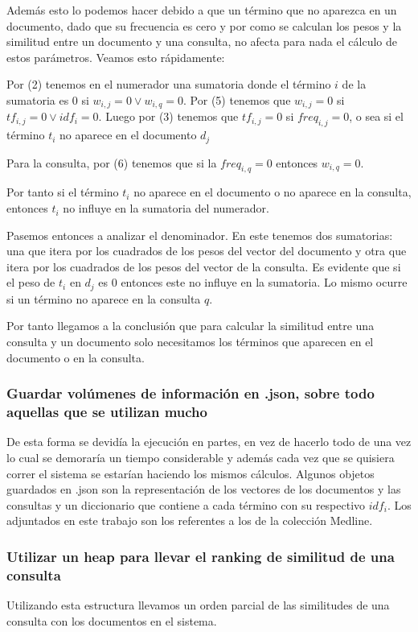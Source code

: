 \documentclass[runningheads]{llncs}
\begin{document}
	Adem\'as esto lo podemos hacer debido a que un t\'ermino que no aparezca en un documento, dado que su frecuencia es cero y por como se calculan los pesos y la similitud entre un documento y una consulta, no afecta para nada el c\'alculo de estos par\'ametros. Veamos esto r\'apidamente:
	
	Por (2) tenemos en el numerador una sumatoria donde el t\'ermino $i$ de la sumatoria es 0 si $w_{i,j}=0 \lor w_{i,q}=0$. Por (5) tenemos que $w_{i,j}=0$ si $tf_{i,j}=0 \lor idf_i=0$. Luego por (3) tenemos que $tf_{i,j}=0$ si $freq_{i,j}=0$, o sea si el t\'ermino $t_i$ no aparece en el documento $d_j$
	
	Para la consulta, por (6) tenemos que si la $freq_{i,q}=0$ entonces $w_{i,q}=0$.
	
	Por tanto si el t\'ermino $t_i$ no aparece en el documento o no aparece en la consulta, entonces $t_i$ no influye en la sumatoria del numerador.
	
	Pasemos entonces a analizar el denominador. En este tenemos dos sumatorias: una que itera por los cuadrados de los pesos del vector del documento y otra que itera por los cuadrados de los pesos del vector de la consulta. Es evidente que si el peso de $t_i$ en $d_j$ es 0 entonces este no influye en la sumatoria. Lo mismo ocurre si un t\'ermino no aparece en la consulta $q$.
	
	Por tanto llegamos a la conclusi\'on que para calcular la similitud entre una consulta y un documento solo necesitamos los t\'erminos que aparecen en el documento o en la consulta.
	
	 \subsubsection{Guardar volúmenes de informaci\'on en .json, sobre todo aquellas que se utilizan mucho} De esta forma se devid\'ia la ejecuci\'on en partes, en vez de hacerlo todo de una vez lo cual se demorar\'ia un tiempo considerable y adem\'as cada vez que se quisiera correr el sistema se estar\'ian haciendo los mismos c\'alculos. Algunos objetos guardados en .json son la representaci\'on de los vectores de los documentos y las consultas y un diccionario que contiene a cada t\'ermino con su respectivo $idf_i$. Los adjuntados en este trabajo son los referentes a los de la colecci\'on Medline.
	
	\subsubsection{Utilizar un heap para llevar el ranking de similitud de una consulta} Utilizando esta estructura llevamos un orden parcial de las similitudes de una consulta con los documentos en el sistema.
		
\end{document}
